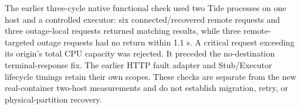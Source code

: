 The earlier three-cycle native functional check used two Tide processes on one host and a controlled executor: six connected/recovered remote requests and three outage-local requests returned matching results, while three remote-targeted outage requests had no return within 1.1 s. A critical request exceeding its origin's total CPU capacity was rejected. It preceded the no-destination terminal-response fix. The earlier HTTP fault adapter and Stub/Executor lifecycle timings retain their own scopes. These checks are separate from the new real-container two-host measurements and do not establish migration, retry, or physical-partition recovery.
